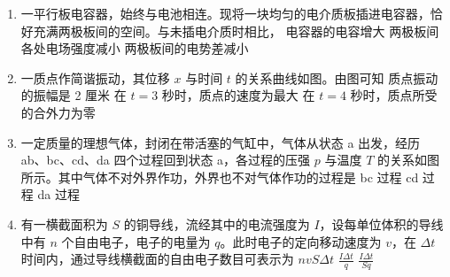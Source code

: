 \documentclass[\gkver]{gaokaozhenti}
\begin{document}
\begin{enumerate}
\item
一平行板电容器，始终与电池相连。现将一块均匀的电介质板插进电容器，恰好充满两极板间的空间。与未插电介质时相比，
{电容器的电容增大}
{两极板间各处电场强度减小}
{两极板间的电势差减小}

\item
一质点作简谐振动，其位移 $x$ 与时间 $t$ 的关系曲线如图。由图可知
{质点振动的振幅是 2 厘米}
{在 $t = 3$ 秒时，质点的速度为最大}
{在 $t = 4$ 秒时，质点所受的合外力为零}

\item
一定质量的理想气体，封闭在带活塞的气缸中，气体从状态 a 出发，经历 ab、bc、cd、da 四个过程回到状态 a，各过程的压强 $p$ 与温度 $T$ 的关系如图所示。其中气体不对外界作功，外界也不对气体作功的过程是
{bc 过程}
{cd 过程}
{da 过程}

\item
有一横截面积为 $S$ 的铜导线，流经其中的电流强度为 $I$，设每单位体积的导线中有 $n$ 个自由电子，电子的电量为 $q$。此时电子的定向移动速度为 $v$，在 $\Delta t$ 时间内，通过导线横截面的自由电子数目可表示为
{$nvS\Delta t$}
{$\frac{I\Delta t}{q}$}
{$\frac{I\Delta t}{Sq}$}


\end{enumerate}
\end{document}
